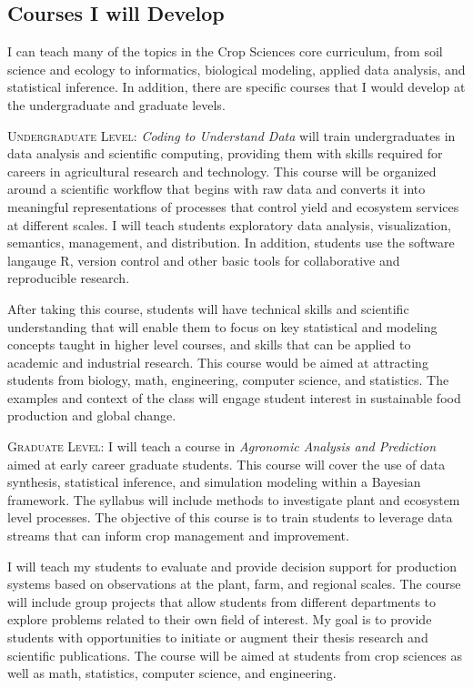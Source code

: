 \documentclass[english]{tufte-handout}
\providecommand\mynewthought[1]{%
   \addvspace{0.5em}%
   \noindent\hspace{-0.5em}\textsc{#1} %
}
\begin{document}
\begin{fullwidth}
\section{Courses I will Develop}

I can teach many of the topics in the Crop Sciences core curriculum, from soil science and ecology to informatics, biological modeling, applied data analysis, and statistical inference. 
In addition, there are specific courses that I would develop at the undergraduate and graduate levels.


\mynewthought{Undergraduate Level:} \emph{Coding to Understand Data} will train undergraduates in data analysis and scientific computing, providing them with skills required for careers in agricultural research and technology.
 This course will be organized around a scientific workflow that begins with raw data and converts it into meaningful representations of processes that control yield and ecosystem services at different scales.
 I will teach students exploratory data analysis, visualization, semantics, management, and distribution.
 In addition, students use the software langauge R, version control and other basic tools for collaborative and reproducible research.

 After taking this course, students will have technical skills and scientific understanding that will enable them to focus on key statistical and modeling concepts taught in higher level courses, and skills that can be applied to academic and industrial research.
 This course would be aimed at attracting students from biology, math, engineering, computer science, and statistics.
 The examples and context of the class will engage student interest in sustainable food production and global change. 

\mynewthought{Graduate Level:} I will teach a course in \emph{Agronomic Analysis and Prediction} aimed at early career graduate students. 
This course will cover the use of data synthesis, statistical inference, and simulation modeling within a Bayesian framework.
The syllabus will include methods to investigate plant and ecosystem level processes.
 The objective of this course is to train students to leverage data streams that can inform crop management and improvement.

 I will teach my students to evaluate and provide decision support for production systems based on observations at the plant, farm, and regional scales.
 The course will include group projects that allow students from different departments to explore problems related to their own field of interest.
 My goal is to provide students with opportunities to initiate or augment their thesis research and scientific publications.
 The course will be aimed at students from crop sciences as well as math, statistics, computer science, and engineering.


\end{fullwidth}
\end{document}
